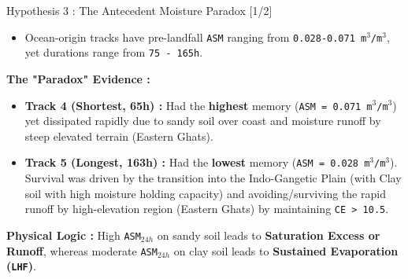 \begin{frame}{Hypothesis 3 : The Antecedent Moisture Paradox [1/2]}
	\vspace{0.1cm}
	\begin{itemize}
		\item Ocean-origin tracks have pre-landfall \texttt{ASM} ranging from \texttt{0.028-0.071 m$^3$/m$^3$}, yet durations range from \texttt{75 - 165h}.
	\end{itemize}

	\vspace{0.1cm}
	\footnotesize
	\textbf{The "Paradox" Evidence :}
	\begin{itemize}
		\item \textbf{Track 4 (Shortest, 65h) :} Had the \textbf{highest} memory (\texttt{ASM = 0.071 m$^3$/m$^3$}) yet dissipated rapidly due to sandy soil over coast and moisture runoff by steep elevated terrain (Eastern Ghats). \cite{clapp1978empirical}
		\item \textbf{Track 5 (Longest, 163h) :} Had the \textbf{lowest} memory (\texttt{ASM = 0.028 m$^3$/m$^3$}). Survival was driven by the transition into the Indo-Gangetic Plain (with Clay soil with high moisture holding capacity) and avoiding/surviving the rapid runoff by high-elevation region (Eastern Ghats) by maintaining \texttt{CE > 10.5}.
	\end{itemize}

	\vspace{0.2cm}
	\footnotesize
	\textbf{Physical Logic :} High \texttt{ASM$_{24h}$} on sandy soil leads to \textbf{Saturation Excess or Runoff}, whereas moderate \texttt{ASM$_{24h}$} on clay soil leads to \textbf{Sustained Evaporation (\texttt{LHF})}.
\end{frame}

